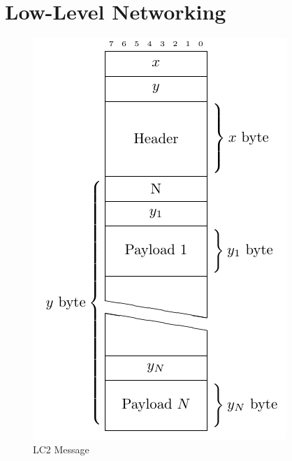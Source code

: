 \section{Low-Level Networking}
\label{ch:networking}

\begin{figure}[h!]
  \centering
  \includegraphics{bin/assets/binary-message-format.pdf}
  \caption{LC2 Message}
  \label{fig:lc2binary}
\end{figure}

\clearpage

